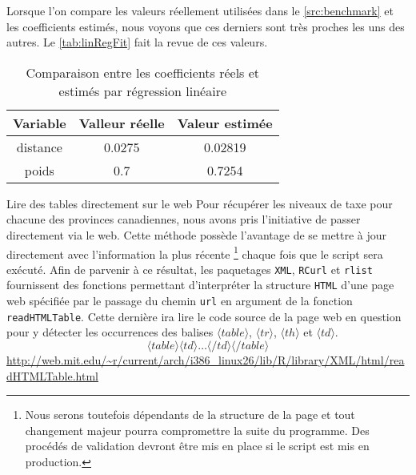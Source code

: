 Lorsque l'on compare les valeurs réellement utilisées dans le \autoref{src:benchmark} et les coefficients estimés, nous voyons que ces derniers sont très proches les uns des autres. Le \autoref{tab:linRegFit} fait la revue de ces valeurs. \\

\begin{table}[h]
	\centering
	\begin{tabular}{ccc}
		\textbf{Variable} & \textbf{Valleur réelle} & \textbf{Valeur estimée} \\
		\hline
		distance & 0.0275 & 0.02819 \\
		poids & 0.7 & 0.7254		
	\end{tabular}
	\caption{Comparaison entre les coefficients réels et estimés par régression linéaire}
	\label{tab:linRegFit}
\end{table}

\begin{moreInfo}{Lire des tables directement sur le web}
	Pour récupérer les niveaux de taxe pour chacune des provinces canadiennes, nous avons pris l'initiative de passer directement via le web. Cette méthode possède l'avantage de se mettre à jour directement avec l'information la plus récente \footnote{Nous serons toutefois dépendants de la structure de la page et tout changement majeur pourra compromettre la suite du programme. Des procédés de validation devront être mis en place si le script est mis en production.} chaque fois que le script sera exécuté. Afin de parvenir à ce résultat, les paquetages \texttt{XML}, \texttt{RCurl} et \texttt{rlist} fournissent des fonctions permettant d'interpréter la structure \texttt{HTML} d'une page web spécifiée par le passage du chemin \texttt{url} en argument de la fonction \texttt{readHTMLTable}. Cette dernière ira lire le code source de la page web en question pour y détecter les occurrences des balises $\langle table \rangle$, $\langle tr \rangle$, $\langle th \rangle$ et $\langle td \rangle$.  $$\langle table \rangle \langle td \rangle \dots \langle /td \rangle \langle /table \rangle$$
	\url{http://web.mit.edu/~r/current/arch/i386_linux26/lib/R/library/XML/html/readHTMLTable.html}
\end{moreInfo}
